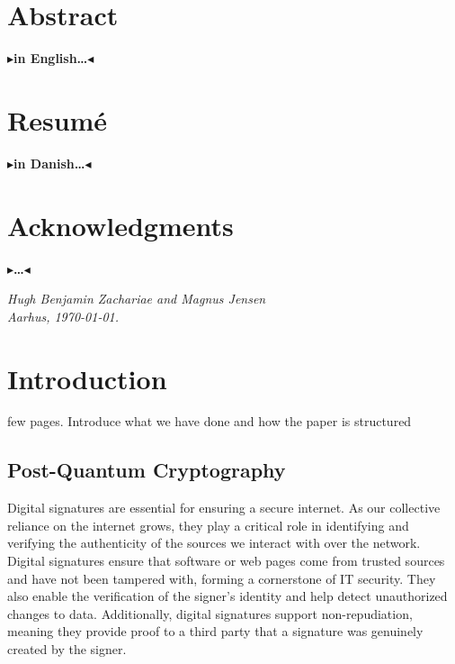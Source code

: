 \documentclass[11pt]{report}
\theoremstyle{definition}
\theoremstyle{plain}
\newcommand{\todo}[1]{{\color[rgb]{.5,0,0}\textbf{$\blacktriangleright$#1$\blacktriangleleft$}}}
\begin{document}
\pagestyle{plain}
\chapter*{Abstract}

\todo{in English\dots}

\chapter*{Resum\'e}

\todo{in Danish\dots}

\chapter*{Acknowledgments}

\todo{\dots}

\vspace{2ex}
\begin{flushright}
  \emph{Hugh Benjamin Zachariae and Magnus Jensen}\\
  \emph{Aarhus, \today.}
\end{flushright}

\tableofcontents
\cleardoublepage
{}
\setcounter{secnumdepth}{2}


\chapter{Introduction}\label{ch:intro}

few pages. Introduce what we have done and how the paper is structured

\section{Post-Quantum Cryptography}\label{sec:quantum}

Digital signatures are essential for ensuring a secure internet. As our collective reliance on the internet grows, they play a critical role in identifying and verifying the authenticity of the sources we interact with over the network. Digital signatures ensure that software or web pages come from trusted sources and have not been tampered with, forming a cornerstone of IT security. They also enable the verification of the signer's identity and help detect unauthorized changes to data. Additionally, digital signatures support non-repudiation, meaning they provide proof to a third party that a signature was genuinely created by the signer.
\end{document}
